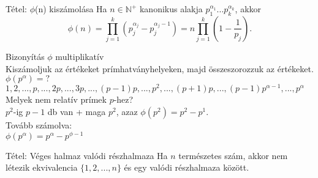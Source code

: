 \documentclass{beamer}
\begin{document}
\begin{frame}

\begin{block}{Tétel: ${\phi}$(n) kiszámolása}
Ha $n \in \mathbb{N}^+$ kanonikus alakja $p_1^{{\alpha}_1}...p_k^{{\alpha}_k}$, akkor\\
$${\phi}(n) = \prod^k_{j=1} (p_j^{{\alpha}_j} - p_j^{{\alpha}_j - 1}) = n \prod^k_{j=1} (1 - \frac{1}{p_j}).$$
\end{block}

\begin{block}{Bizonyítás}
$\phi$ multiplikatív\\
Kiszámoljuk az értékeket prímhatványhelyeken, majd összeszorozzuk az értékeket.\\
${\phi}(p^{\alpha}) = ?$\\
$1, 2, ..., p, ..., 2p, ..., 3p, ..., (p-1)p, ..., p^2, ..., (p+1)p, ..., (p-1)p^{{\alpha}-1}, ..., p^{\alpha}$\\
Melyek nem relatív prímek $p$-hez?\\
\smallskip
$p^2$-ig $p - 1$ db van + maga $p^2$, azaz ${\phi}(p^2) = p^2 - p^1$.\\
Tovább számolva:\\
${\phi}(p^{\alpha}) = p^{\alpha} - p^{\phi - 1}$

\end{block}

\end{frame}

\begin{frame}[plain]
\end{frame}

\begin{frame}

\begin{block}{Tétel: Véges halmaz valódi részhalmaza}
Ha $n$ természetes szám, akkor nem létezik ekvivalencia $\{1, 2, ..., n\}$ és egy valódi részhalmaza között.	

\end{block}

\end{frame}
\end{document}
